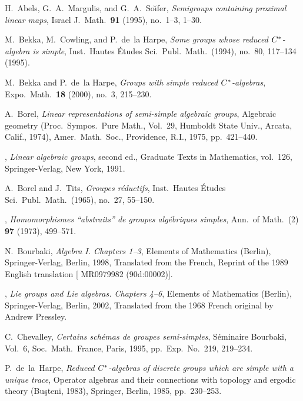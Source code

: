 \documentclass{amsart}
\theoremstyle{plain}
\theoremstyle{definition}
\theoremstyle{remark}
\begin{document}
\begin{thebibliography}{10}

H.~Abels, G.~A.~Margulis, and G.~A.~So{\u\i}fer, \emph{Semigroups containing
  proximal linear maps}, Israel J.\ Math.\ \textbf{91} (1995), no.~1--3, 1--30.

M.~Bekka, M.~Cowling, and P.~de~la Harpe, \emph{Some groups whose reduced
  ${C}\sp *$-algebra is simple}, Inst.\ Hautes \'Etudes Sci.\ Publ.\ Math.\ (1994),
  no.~80, 117--134 (1995).

M.~Bekka and P.~de~la Harpe, \emph{Groups with simple reduced ${C}\sp
  *$-algebras}, Expo.\ Math.\ \textbf{18} (2000), no.~3, 215--230.

A.~Borel, \emph{Linear representations of semi-simple algebraic groups},
  Algebraic geometry ({P}roc.\ {S}ympos.\ {P}ure {M}ath., {V}ol.\ 29, {H}umboldt
  {S}tate {U}niv., {A}rcata, {C}alif., 1974), Amer.\ Math.\ Soc., Providence,
  R.I., 1975, pp.~421--440.

\bysame, \emph{Linear algebraic groups}, second ed., Graduate Texts in
  Mathematics, vol.\ 126, Springer-Verlag, New York, 1991.

A.~Borel and J.~Tits, \emph{Groupes r\'eductifs}, Inst.\ Hautes \'Etudes Sci.\ 
  Publ.\ Math.\ (1965), no.~27, 55--150.

\bysame, \emph{Homomorphismes ``abstraits'' de groupes alg\'ebriques simples},
  Ann.\ of Math.\ (2) \textbf{97} (1973), 499--571.

N.~Bourbaki, \emph{Algebra {I}. {C}hapters 1--3}, Elements of Mathematics
  (Berlin), Springer-Verlag, Berlin, 1998, Translated from the French, Reprint
  of the 1989 English translation [ MR0979982 (90d:00002)].

\bysame, \emph{Lie groups and {L}ie algebras. {C}hapters 4--6}, Elements of
  Mathematics (Berlin), Springer-Verlag, Berlin, 2002, Translated from the 1968
  French original by Andrew Pressley.

C.~Chevalley, \emph{Certains sch\'emas de groupes semi-simples}, S\'eminaire
  {B}ourbaki, {V}ol.\ 6, Soc.\ Math.\ France, Paris, 1995, pp.~Exp.\ No.\ 219,
  219--234.

P.~de~la~Harpe, \emph{Reduced ${C}\sp \ast$-algebras of discrete groups which
  are simple with a unique trace}, Operator algebras and their connections with
  topology and ergodic theory (Bu\c steni, 1983), Springer, Berlin, 1985,
  pp.~230--253.


\end{thebibliography}
\end{document}
